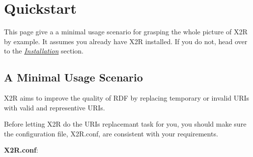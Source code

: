 \documentclass[letterpaper,10pt,english]{sphinxmanual}
\begin{document}
\section{Quickstart}
\label{docs/quickstart::doc}\label{docs/quickstart:quickstart}\label{docs/quickstart:id1}
This page give a a minimal usage scenario for grasping the whole picture of X2R by example. It assumes you already have X2R installed. If you do not, head over to the {\hyperref[docs/install:installation]{\emph{Installation}}} section.


\subsection{A Minimal Usage Scenario}
\label{docs/quickstart:a-minimal-usage-scenario}
X2R aims to improve the quality of RDF by replacing temporary or invalid URIs with valid and representive URIs.

Before letting X2R do the URIs replacemant task for you, you should make sure the configuration file, X2R.conf, are
consistent with your requirements.

\textbf{X2R.conf}:
\end{document}

